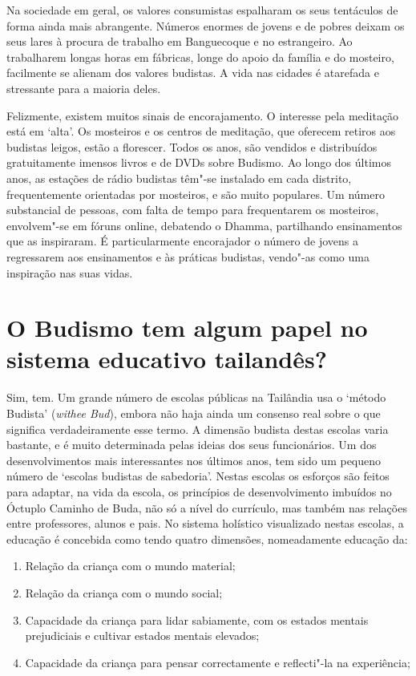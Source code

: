 Na sociedade em geral, os valores consumistas espalharam os seus
tentáculos de forma ainda mais abrangente. Números enormes de jovens e
de pobres deixam os seus lares à procura de trabalho em Banguecoque e no
estrangeiro. Ao trabalharem longas horas em fábricas, longe do apoio da
família e do mosteiro, facilmente se alienam dos valores budistas. A
vida nas cidades é atarefada e stressante para a maioria deles.

Felizmente, existem muitos sinais de encorajamento. O interesse pela
meditação está em `alta'. Os mosteiros e os centros de meditação, que
oferecem retiros aos budistas leigos, estão a florescer. Todos os anos,
são vendidos e distribuídos gratuitamente imensos livros e de DVDs sobre
Budismo. Ao longo dos últimos anos, as estações de rádio budistas têm"-se
instalado em cada distrito, frequentemente orientadas por mosteiros, e
são muito populares. Um número substancial de pessoas, com falta de
tempo para frequentarem os mosteiros, envolvem"-se em fóruns online,
debatendo o Dhamma, partilhando ensinamentos que as inspiraram. É
particularmente encorajador o número de jovens a regressarem aos
ensinamentos e às práticas budistas, vendo"-as como uma inspiração nas
suas vidas.

\section{O Budismo tem algum papel no sistema educativo tailandês?}

Sim, tem. Um grande número de escolas públicas na Tailândia usa o
`método Budista' (\emph{withee Bud}), embora não haja ainda um
consenso real sobre o que significa verdadeiramente esse termo. A
dimensão budista destas escolas varia bastante, e é muito determinada
pelas ideias dos seus funcionários. Um dos desenvolvimentos mais
interessantes nos últimos anos, tem sido um pequeno número de `escolas
budistas de sabedoria'. Nestas escolas os esforços são feitos para
adaptar, na vida da escola, os princípios de desenvolvimento imbuídos no
Óctuplo Caminho de Buda, não só a nível do currículo, mas também nas
relações entre professores, alunos e pais. No sistema holístico
visualizado nestas escolas, a educação é concebida como tendo quatro
dimensões, nomeadamente educação da:

\begin{enumerate}
\item Relação da criança com o mundo material;
\item Relação da criança com o mundo social;
\item Capacidade da criança para lidar sabiamente, com os estados mentais
  prejudiciais e cultivar estados mentais elevados;
\item Capacidade da criança para pensar correctamente e reflecti"-la na
  experiência;
\end{enumerate}

